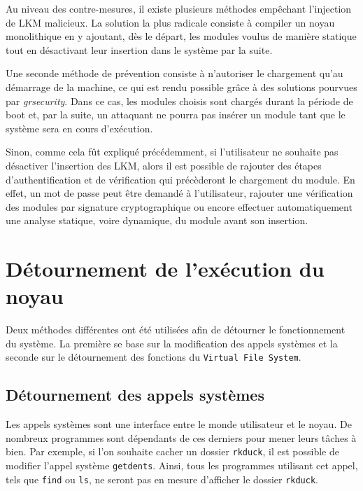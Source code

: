 \documentclass[12pt]{article}
\begin{document}
        Au niveau des contre-mesures, il existe plusieurs méthodes empêchant l'injection de LKM malicieux. La solution la plus radicale consiste à compiler un noyau monolithique en y ajoutant, dès le départ, les modules voulus de manière statique tout en désactivant leur insertion dans le système par la suite.

        Une seconde méthode de prévention consiste à n'autoriser le chargement qu'au démarrage de la machine, ce qui est rendu possible grâce à des solutions pourvues par \textit{grsecurity}. Dans ce cas, les modules choisis sont chargés durant la période de boot et, par la suite, un attaquant ne pourra pas insérer un module tant que le système sera en cours d'exécution.

        Sinon, comme cela fût expliqué précédemment, si l'utilisateur ne souhaite pas désactiver l'insertion des LKM, alors il est possible de rajouter des étapes d'authentification et de vérification qui précèderont le chargement du module. En effet, un mot de passe peut être demandé à l'utilisateur, rajouter une vérification des modules par signature cryptographique ou encore effectuer automatiquement une analyse statique, voire dynamique, du module avant son insertion.
    
\section{Détournement de l'exécution du noyau}  

Deux méthodes différentes ont été utilisées afin de détourner le fonctionnement du système. La première se base sur la modification des appels systèmes et la seconde sur le détournement des fonctions du \texttt{Virtual File System}.

    \subsection{Détournement des appels systèmes}
    
        Les appels systèmes sont une interface entre le monde utilisateur et le noyau. De nombreux programmes sont dépendants de ces derniers pour mener leurs tâches à bien. Par exemple, si l'on souhaite cacher un dossier \texttt{rkduck}, il est possible de modifier l'appel système \texttt{getdents}. Ainsi, tous les programmes utilisant cet appel, tels que \texttt{find} ou \texttt{ls}, ne seront pas en mesure d'afficher le dossier \texttt{rkduck}.\\
\end{document}
